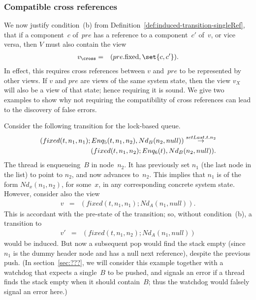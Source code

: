 

\subsubsection{Compatible cross references}
\label{ssec:cross-refs}

We now justify condition~(b) from
Definition~\ref{def:induced-transition-singleRef}, that if a component~$c$
of~$pre$ has a reference to a component~$c'$ of~$v$, or vice versa, then $V$
must also contain the view
\begin{eqnarray*}
v_\cross & = & (pre.\fixed, \set{c, c'}).
\end{eqnarray*} 
In effect, this requires cross references between $v$ and~$pre$ to be
represented by other views.  If $v$ and $pre$ are views of the same system
state, then the view $v_X$ will also be a view of that state; hence requiring
it is sound.
%
We give two examples to show why not requiring the compatibility of cross
references can lead to the discovery of false errors. 

Consider the following transition for the lock-based queue.
\[
\begin{align}
(fixed(t, n_1, n_1); Enq_5(t, n_1, n_2), Nd_B(n_2, null)) 
  \stackrel{setLast.t.n_2}\rightarrow \\
\qquad (fixed(t, n_1, n_2); Enq_6(t), Nd_B(n_2, null)).
\end{align}
\]
The thread is enqueueing~$B$ in node~$n_2$.  It has previously set $n_1$ (the
last node in the list) to point to $n_2$, and now advances 
to~$n_2$.  This implies that $n_1$ is of the form $Nd_x(n_1, n_2)$, for
some~$x$, in any corresponding concrete system state.  However, consider also
the view
%
\begin{eqnarray*}
v & = & (fixed(t, n_1, n_1) ; Nd_A(n_1, null)).
\end{eqnarray*}
This is accordant with the pre-state of the transition; so, without
condition~(b), a transition to
\begin{eqnarray*}
v' & = & (fixed(t, n_1, n_2) ; Nd_A(n_1, null))
\end{eqnarray*}
would be induced.  But now a subsequent pop would find the stack empty (since
$n_1$ is the dummy header node and has a null next reference), despite the
previous push.  (In section~\ref{sec:???}, we will consider this example
together with a watchdog that expects a single~$B$ to be pushed, and signals
an error if a thread finds the stack empty when it should contain~$B$; thus
the watchdog would falsely signal an error here.)

